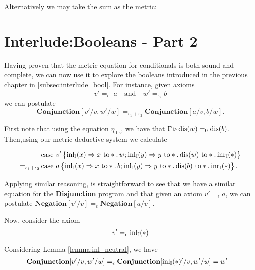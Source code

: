 Alternatively we may take the sum as the metric:


\section{Interlude:Booleans - Part 2}

Having proven that the metric equation for conditionals is both sound and complete, we can now use it to explore the booleans introduced in the previous chapter in \autoref{subsec:interlude_bool}. For instance, given axioms
$$ v' =_{\epsilon_1} a \quad \text{and}  \quad w' =_{\epsilon_2} b $$
we can postulate 
$$ \textbf{Conjunction} [v'/v, w'/w]  =_{\epsilon_1 + \epsilon_2}  \textbf{Conjunction} [a/v, b/w]. $$

First note that using the equation $\eta_{\text{dis}}$, we have that $\Gamma \triangleright \text{dis}(w) =_{0} \text{dis}(b)$.
Then,using our metric deductive system we calculate

\begin{align*}
  &\text{case } v'  
    \left\{ \begin{aligned}
    \mathrm{inl}_{\mathbb{I}}(x) \Rightarrow  x \text{ to} *. \, w ;  \mathrm{inl}_{\mathbb{I}}(y) \Rightarrow y \text{ to} *. \,  \text{dis}(w) \text{ to} *. \, \mathrm{inr}_{\mathbb{I}}(*)
  \end{aligned}  \right\}   \\
  =_{\epsilon_1 + \epsilon_2} \, & \text{case } a  
    \left\{ \begin{aligned}
     \mathrm{inl}_{\mathbb{I}}(x) \Rightarrow  x \text{ to} *. \, b ;  \mathrm{inl}_{\mathbb{I}}(y) \Rightarrow y \text{ to} *. \,  \text{dis}(b) \text{ to} *. \, \mathrm{inr}_{\mathbb{I}}(*)
  \end{aligned}  \right\}.
\end{align*}

Applying similar reasoning, is straightforward to see that we have a similar equation for the \textbf{Disjunction} program and that given an axiom $ v' =_{\epsilon} a $, we can postulate $\textbf{Negation} [v'/v] =_{\epsilon} \textbf{Negation} [a/v] $.

Now, consider the axiom
$$ v' =_{\epsilon} \mathrm{inl}_{\mathbb{I}}(*)$$

Considering Lemma \ref{lemma:inl_neutral}, we have
\begin{align*}
   \textbf{Conjunction} [v'/v, w'/w]  &=_{\epsilon}  \textbf{Conjunction} [ \mathrm{inl}_{\mathbb{I}}(*)'/v, w'/w] = w'
\end{align*}


